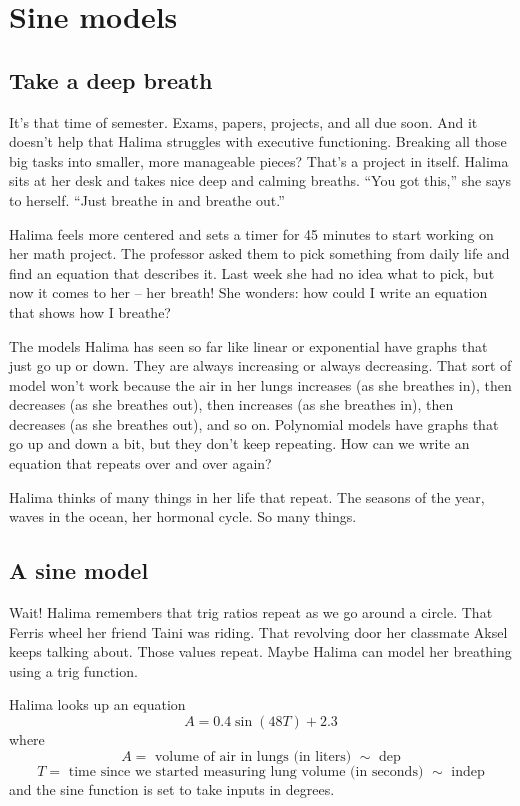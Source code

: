 
\section{Sine models} 

\subsection*{Take a deep breath}

It's that time of semester.  Exams, papers, projects, and all due soon.  And it doesn't help that Halima struggles with executive functioning.  Breaking all those big tasks into smaller, more manageable pieces?  That's a project in itself. Halima sits at her desk and takes nice deep and calming breaths. ``You got this,'' she says to herself.  ``Just breathe in and breathe out.''

Halima feels more centered and sets a timer for 45 minutes to start working on her math project. The professor asked them to pick something from daily life and find an equation that describes it.  Last week she had no idea what to pick, but now it comes to her -- her breath!  She wonders: how could I write an equation that shows how I breathe?

The models Halima has seen so far like linear or exponential have graphs that just go up or down. They are always increasing or always decreasing. That sort of model won't work because the air in her lungs increases (as she breathes in), then decreases (as she breathes out), then increases (as she breathes in), then decreases (as she breathes out), and so on.  Polynomial models have graphs that go up and down a bit, but they don't keep repeating.  How can we write an equation that repeats over and over again?

Halima thinks of many things in her life that repeat. The seasons of the year, waves in the ocean, her hormonal cycle.  So many things.

\subsection*{A sine model}

Wait!  Halima remembers that trig ratios repeat as we go around a circle.  That Ferris wheel her friend Taini was riding.  That revolving door her classmate Aksel keeps talking about.  Those values repeat.  Maybe Halima can model her breathing using a trig function.  

Halima looks up an equation
$$A = 0.4\sin(48T) + 2.3$$
where 
$$A = \text{ volume of air in lungs (in liters) } \sim \text{ dep}$$
$$T = \text{ time since we started measuring lung volume (in seconds) } \sim \text{ indep}$$
and the sine function is set to take inputs in degrees.

